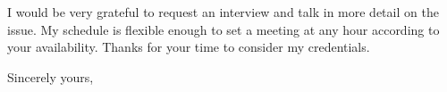 \documentclass{letter} 					%
\begin{document}
\begin{letter}
\noindent
I would be very grateful to request an interview and talk in more detail on the issue. My schedule is flexible enough to set a meeting at any hour according to your availability. Thanks for your time to consider my credentials.
 
\closing{Sincerely yours,} 
  

%
%
%
%
%
%
%


%
% 
% 


\end{letter}
\end{document}
